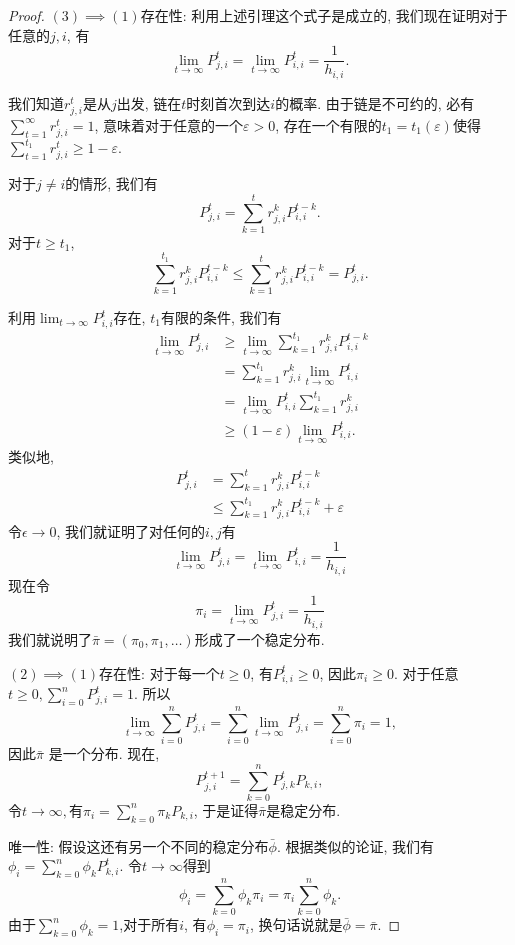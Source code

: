 \begin{proof}
    $(3) \implies (1)$存在性: 利用上述引理这个式子是成立的, 我们现在证明对于任意的$j, i$, 有
    $$\lim _{t \rightarrow \infty} P_{j, i}^t=\lim _{t \rightarrow \infty} P_{i, i}^t=\frac{1}{h_{i, i}}.$$
    
    我们知道$r_{j, i}^t$是从$j$出发, 链在$t$时刻首次到达$i$的概率. 由于链是不可约的, 必有$\sum_{t=1}^{\infty} r_{j, i}^t=1$, 意味着对于任意的一个$\varepsilon>0$, 存在一个有限的$t_1=t_1(\varepsilon)$使得$\sum_{t=1}^{t_1} r_{j, i}^t \geq 1-\varepsilon$. 
    
    对于$j\neq i$的情形, 我们有
    $$P_{j, i}^t=\sum_{k=1}^t r_{j, i}^k P_{i, i}^{t-k}.$$ 
    对于$t\geq t_1$, $$\sum_{k=1}^{t_1} r_{j, i}^k P_{i, i}^{t-k} \leq \sum_{k=1}^t r_{j, i}^k P_{i, i}^{t-k}=P_{j, i}^t.$$
    
    利用$\lim _{t \rightarrow \infty} P_{i, i}^t$存在, $t_1$有限的条件, 我们有
    $$
    \begin{aligned}
    \lim _{t \rightarrow \infty} P_{j, i}^t & \geq \lim _{t \rightarrow \infty} \sum_{k=1}^{t_1} r_{j, i}^k P_{i, i}^{t-k} \\
    & =\sum_{k=1}^{t_1} r_{j, i}^k \lim _{t \rightarrow \infty} P_{i, i}^t \\
    & =\lim _{t \rightarrow \infty} P_{i, i}^t \sum_{k=1}^{t_1} r_{j, i}^k \\
    & \geq(1-\varepsilon) \lim _{t \rightarrow \infty} P_{i, i}^t .
    \end{aligned}
    $$
    类似地, 
    $$
    \begin{aligned}
    P_{j, i}^t & =\sum_{k=1}^t r_{j, i}^k P_{i, i}^{t-k} \\
    & \leq \sum_{k=1}^{t_1} r_{j, i}^k P_{i, i}^{t-k}+\varepsilon
    \end{aligned}
    $$
    令$\epsilon \to 0$, 我们就证明了对任何的$i, j$有
    $$
    \lim _{t \rightarrow \infty} P_{j, i}^t=\lim _{t \rightarrow \infty} P_{i, i}^t=\frac{1}{h_{i, i}}
    $$
    现在令
    $$
    \pi_i=\lim _{t \rightarrow \infty} P_{j, i}^t=\frac{1}{h_{i, i}}
    $$
    我们就说明了$\bar{\pi}=\left(\pi_0, \pi_1, \ldots\right)$形成了一个稳定分布. 

    $(2)\implies(1)$存在性: 对于每一个$t\geq 0$, 有$P_{i,i}^t\geq 0$, 因此$\pi_i\geq 0$. 对于任意$t \geq 0, \sum_{i=0}^n P_{j, i}^t=1$. 所以$$\lim _{t \rightarrow \infty} \sum_{i=0}^n P_{j, i}^t=\sum_{i=0}^n \lim _{t \rightarrow \infty} P_{j, i}^t=\sum_{i=0}^n \pi_i=1,$$因此$\bar \pi$ 是一个分布. 现在, $$P_{j, i}^{t+1}=\sum_{k=0}^n P_{j, k}^t P_{k, i},$$令$t\to \infty, $有$\pi_i=\sum_{k=0}^n \pi_k P_{k, i}$, 于是证得$\bar \pi$是稳定分布. 

    唯一性: 假设这还有另一个不同的稳定分布$\bar{\phi}$. 根据类似的论证, 我们有$\phi_i=\sum_{k=0}^n \phi_k P_{k, i}^t$. 令$t \rightarrow \infty$得到$$\phi_i=\sum_{k=0}^n \phi_k \pi_i=\pi_i \sum_{k=0}^n \phi_k.$$ 由于$\sum_{k=0}^n \phi_k=1$,对于所有$i$, 有$\phi_i=\pi_i$, 换句话说就是$\bar{\phi}=\bar{\pi}$.
\end{proof}


